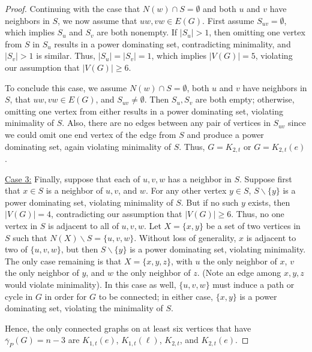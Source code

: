 \documentclass{article}
\numberwithin{figure}{section}   %
\theoremstyle{definition}
\theoremstyle{definition}
\theoremstyle{definition}
\newcommand{\ol}{\overline}
\newcommand{\pd}{\gamma_P}
\newcommand{\pdbar}{\ol\pd}
\begin{document}
\begin{proof}
Continuing with the case that $N(w) \cap S = \emptyset$ and both $u$ and $v$ have neighbors in $S$, we now assume that $uw, vw \in E(G)$.   First assume $S_{uv} = \emptyset$, which implies  $S_u$ and $S_v$ are both nonempty.  If $|S_u|>1$, then omitting one vertex from $S$ in  $S_u$  results in a power dominating set, contradicting minimality, and  $|S_v|>1$ is similar.  Thus,  $|S_u|=|S_v|=1$, which implies $|V(G)|=5$, violating our assumption that $|V(G)| \geq 6$. 

To conclude this case, we assume  $N(w) \cap S = \emptyset$, both $u$ and $v$ have neighbors in $S$, that $uw, vw \in E(G)$, and $S_{uv} \neq \emptyset$.  Then $S_u, S_v$ are both  empty; otherwise, omitting one vertex from either results in a power dominating {set,} violating minimality of $S$.  Also, there are no edges between any pair of vertices in $S_{uv}$ since we could omit one end vertex of the edge from $S$ and produce a power dominating set, again violating minimality of $S$.  Thus,   $G=K_{2,t}$ or $G=K_{2,t}(e)$. %

\underline{Case 3:} Finally, suppose that each of $u, v, w$ has a neighbor in $S$.  Suppose first that  $x \in S$ is a neighbor of $u, v$, and $w$.  For any other vertex $y \in S$, $S \backslash \{y\}$ is a power dominating set, violating minimality of $S$. But if no such $y$ exists, then $|V(G)|=4$, contradicting our assumption that $|V(G)| \geq 6$.  
Thus, no one vertex in $S$ is adjacent to all of $u, v, w$.  {Let $X=\{x,y\}$ be a set of two  vertices in $S$ such that $N(X) \backslash S = \{u, v, w\}$. Without loss of generality, $x$ is adjacent to two of $\{u,v,w\}$, but then  $S \backslash \{y\}$ is a power dominating set, violating minimality.  %
  The} only case remaining is that $X = \{x, y, z\}$, with $u$ the only neighbor of $x$, $v$ the only neighbor of $y$, and $w$ the only neighbor of $z$.  (Note an edge among $x, y, z$ would violate minimality).  In this case as well, $\{u, v,w\}$ must induce a path or cycle in $G$ in order for $G$ to be connected; in either case, $\{x, y\}$ is a power dominating set, violating the minimality of $S$.  

Hence, the only connected graphs on at least six vertices that have $\pdbar(G)=n-3$ are $K_{1,t}(e)$,  $K_{1,t}(\ell)$, $K_{2,t}$, and  $K_{2,t}(e)$. 
\end{proof}
\end{document}
